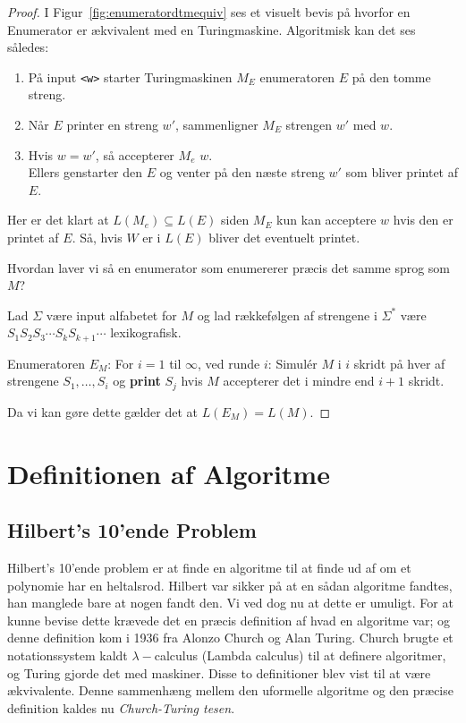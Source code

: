 \begin{proof}
	I Figur~\ref{fig:enumeratordtmequiv} ses et visuelt bevis på hvorfor en Enumerator er ækvivalent med en Turingmaskine. Algoritmisk kan det ses således:
	\begin{enumerate}
		\item På input \texttt{<w>} starter Turingmaskinen $M_{E}$ enumeratoren $E$ på den tomme streng.
		\item Når $E$ printer en streng $w'$, sammenligner $M_{E}$  strengen $w'$ med $w$.
		\item Hvis $w = w'$, så accepterer $M_{e}$ $w$. \\ \noindent Ellers genstarter den $E$ og venter på den næste streng $w'$ som bliver printet af $E$.
	\end{enumerate}
	Her er det klart at $L(M_{e}) \subseteq L(E)$ siden $M_{E}$  kun kan acceptere $w$ hvis den er printet af $E$. Så, hvis $W$ er i $L(E)$ bliver det eventuelt printet.

	Hvordan laver vi så en enumerator som enumererer præcis det samme sprog som $M$?

	Lad $\Sigma$ være input alfabetet for $M$ og lad rækkefølgen af strengene i $\Sigma^{*}$ være $S_{1}S_{2}S_{3} \cdots S_{k}S_{k+1} \cdots$ lexikografisk.

	Enumeratoren $E_{M}$: For $i = 1$ til $\infty$, ved runde $i$: Simulér $M$  i $i$ skridt på hver af strengene $S_{1}, \ldots, S_{i}$ og \textbf{print} $S_{j}$ hvis $M$ accepterer det i mindre end $i+1$ skridt.

	Da vi kan gøre dette gælder det at $L(E_{M}) = L(M)$.
\end{proof}

\section{Definitionen af Algoritme}%
\label{sec:definitionofalgorithm}

\subsection{Hilbert's 10'ende Problem}%
\label{subsec:hilberts10thproblem}

Hilbert's 10'ende problem er at finde en algoritme til at finde ud af om et polynomie har en heltalsrod. Hilbert var sikker på at en sådan algoritme fandtes, han manglede bare at nogen fandt den. Vi ved dog nu at dette er umuligt. For at kunne bevise dette krævede det en præcis definition af hvad en algoritme var; og denne definition kom i 1936 fra Alonzo Church og Alan Turing. Church brugte et notationssystem kaldt $\lambda-$calculus (Lambda calculus) til at definere algoritmer, og Turing gjorde det med maskiner. Disse to definitioner blev vist til at være ækvivalente. Denne sammenhæng mellem den uformelle algoritme og den præcise definition kaldes nu \textit{Church-Turing tesen}.

